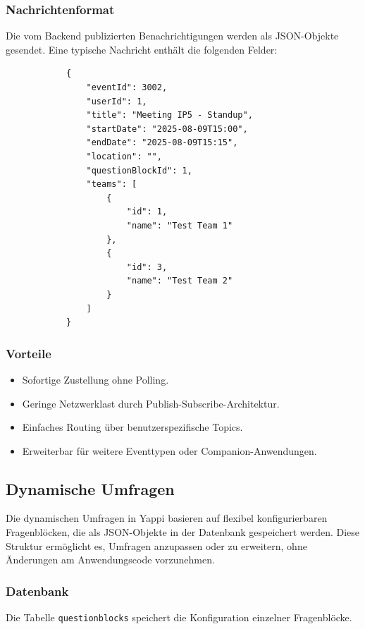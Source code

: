 \documentclass[12pt,a4paper]{report}
\begin{document}
    \subsubsection{Nachrichtenformat}
        Die vom Backend publizierten Benachrichtigungen werden als JSON-Objekte gesendet.
        Eine typische Nachricht enthält die folgenden Felder:

        \begin{verbatim}
            {
                "eventId": 3002,
                "userId": 1,
                "title": "Meeting IP5 - Standup",
                "startDate": "2025-08-09T15:00",
                "endDate": "2025-08-09T15:15",
                "location": "",
                "questionBlockId": 1,
                "teams": [
                    {
                        "id": 1,
                        "name": "Test Team 1"
                    },
                    {
                        "id": 3,
                        "name": "Test Team 2"
                    }
                ]
            }
        \end{verbatim}

    \subsubsection{Vorteile}
        \begin{itemize}
            \item Sofortige Zustellung ohne Polling.
            \item Geringe Netzwerklast durch Publish-Subscribe-Architektur.
            \item Einfaches Routing über benutzerspezifische Topics.
            \item Erweiterbar für weitere Eventtypen oder Companion-Anwendungen.
        \end{itemize}



\subsection{Dynamische Umfragen}
    Die dynamischen Umfragen in Yappi basieren auf flexibel konfigurierbaren Fragenblöcken, die als JSON-Objekte in der Datenbank gespeichert werden.
    Diese Struktur ermöglicht es, Umfragen anzupassen oder zu erweitern, ohne Änderungen am Anwendungscode vorzunehmen.

    \subsubsection{Datenbank}
        Die Tabelle \texttt{questionblocks} speichert die Konfiguration einzelner Fragenblöcke.
\end{document}
